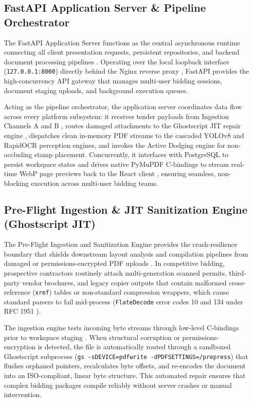 \subsection{FastAPI Application Server \& Pipeline Orchestrator}
The FastAPI Application Server functions as the central asynchronous runtime connecting all client presentation requests, persistent repositories, and backend document processing pipelines \cite{ref54}.
Operating over the local loopback interface (\texttt{127.0.0.1:8000}) directly behind the Nginx reverse proxy \cite{ref58}, FastAPI provides the high-concurrency API gateway that manages multi-user bidding sessions, document staging uploads, and background execution queues.

Acting as the pipeline orchestrator, the application server coordinates data flow across every platform subsystem: it receives tender payloads from Ingestion Channels A and B \cite{ref12}, routes damaged attachments to the Ghostscript JIT repair engine \cite{ref15}, dispatches clean in-memory PDF streams to the cascaded YOLOv8 \cite{ref29} and RapidOCR \cite{ref22} perception engines, and invokes the Active Dodging engine \cite{ref34} for non-occluding stamp placement.
Concurrently, it interfaces with PostgreSQL \cite{ref55} to persist workspace states and drives native PyMuPDF C-bindings \cite{ref40} to stream real-time WebP page previews back to the React client \cite{ref36}, ensuring seamless, non-blocking execution across multi-user bidding teams.

\subsection{Pre-Flight Ingestion \& JIT Sanitization Engine (Ghostscript JIT)}
The Pre-Flight Ingestion and Sanitization Engine provides the crash-resilience boundary that shields downstream layout analysis and compilation pipelines from damaged or permissions-encrypted PDF uploads \cite{ref12}.
In competitive bidding, prospective contractors routinely attach multi-generation scanned permits, third-party vendor brochures, and legacy copier outputs that contain malformed cross-reference (\texttt{xref}) tables or non-standard compression wrappers, which cause standard parsers to fail mid-process (\texttt{FlateDecode} error codes 10 and 134 under RFC 1951 \cite{ref14}).

The ingestion engine tests incoming byte streams through low-level C-bindings prior to workspace staging \cite{ref12}.
When structural corruption or permissions-encryption is detected, the file is automatically routed through a sandboxed Ghostscript subprocess (\texttt{gs -sDEVICE=pdfwrite -dPDFSETTINGS=/prepress}) \cite{ref15} that flushes orphaned pointers, recalculates byte offsets, and re-encodes the document into an ISO-compliant, linear byte structure.
This automated repair ensures that complex bidding packages compile reliably without server crashes or manual intervention.

